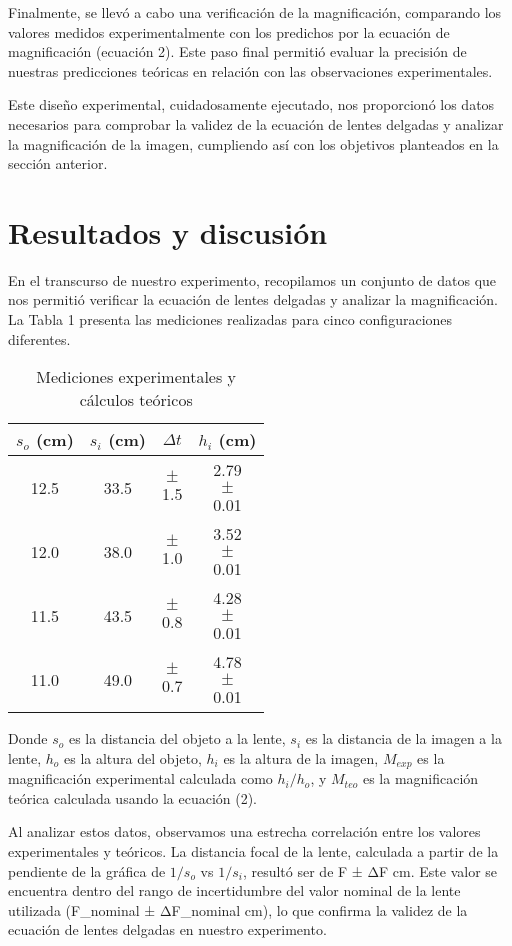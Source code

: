 \documentclass[twocolumn,a4paper,11pt]{scrartcl}
\begin{document}
Finalmente, se llevó a cabo una verificación de la magnificación, comparando los valores medidos experimentalmente con los predichos por la ecuación de magnificación (ecuación 2). Este paso final permitió evaluar la precisión de nuestras predicciones teóricas en relación con las observaciones experimentales.

Este diseño experimental, cuidadosamente ejecutado, nos proporcionó los datos necesarios para comprobar la validez de la ecuación de lentes delgadas y analizar la magnificación de la imagen, cumpliendo así con los objetivos planteados en la sección anterior.

\section{Resultados y discusión}

En el transcurso de nuestro experimento, recopilamos un conjunto de datos que nos permitió verificar la ecuación de lentes delgadas y analizar la magnificación. La Tabla 1 presenta las mediciones realizadas para cinco configuraciones diferentes.

\begin{table}[h]
\centering
\caption{Mediciones experimentales y cálculos teóricos}
\label{tab:mediciones}
\begin{tabular}{|c|c|c|c|}
\hline
$s_o$ (cm) & $s_i$ (cm) & $$\Delta t$$ & $h_i$ (cm) \\
\hline
12.5 & 33.5 & $$\pm$$ 1.5 & 2.79 $$\pm$$ 0.01  \\
12.0 & 38.0 & $$\pm$$ 1.0 & 3.52 $$\pm$$ 0.01 \\
11.5 & 43.5 & $$\pm$$ 0.8 & 4.28 $$\pm$$ 0.01 \\
11.0 & 49.0 & $$\pm$$ 0.7 & 4.78 $$\pm$$ 0.01  \\
\hline
\end{tabular}
\end{table}

Donde $s_o$ es la distancia del objeto a la lente, $s_i$ es la distancia de la imagen a la lente, $h_o$ es la altura del objeto, $h_i$ es la altura de la imagen, $M_{exp}$ es la magnificación experimental calculada como $h_i/h_o$, y $M_{teo}$ es la magnificación teórica calculada usando la ecuación (2).

Al analizar estos datos, observamos una estrecha correlación entre los valores experimentales y teóricos. La distancia focal de la lente, calculada a partir de la pendiente de la gráfica de $1/s_o$ vs $1/s_i$, resultó ser de F ± ΔF cm. Este valor se encuentra dentro del rango de incertidumbre del valor nominal de la lente utilizada (F_nominal ± ΔF_nominal cm), lo que confirma la validez de la ecuación de lentes delgadas en nuestro experimento.
\end{document}
